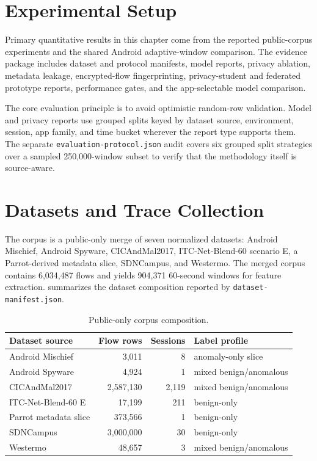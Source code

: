 \section{Experimental Setup}
Primary quantitative results in this chapter come from the reported public-corpus experiments and
the shared Android adaptive-window comparison. The evidence package includes dataset and protocol
manifests, model reports, privacy ablation, metadata leakage, encrypted-flow fingerprinting,
privacy-student and federated prototype reports, performance gates, and the app-selectable model
comparison.

The core evaluation principle is to avoid optimistic random-row validation. Model and privacy
reports use grouped splits keyed by dataset source, environment, session, app family, and time
bucket wherever the report type supports them. The separate \texttt{evaluation-protocol.json} audit
covers six grouped split strategies over a sampled 250,000-window subset to verify that the
methodology itself is source-aware.

\section{Datasets and Trace Collection}
The corpus is a public-only merge of seven normalized datasets: Android Mischief, Android Spyware,
CICAndMal2017, ITC-Net-Blend-60 scenario E, a Parrot-derived metadata slice, SDNCampus, and
Westermo. The merged corpus contains 6,034,487 flows and yields 904,371 60-second windows for
feature extraction.  summarizes the dataset composition reported by
\texttt{dataset-manifest.json}.

\begin{table}[htbp]
  \centering
  \caption{Public-only corpus composition.}
  \label{tab:dataset-sources}
  \small
  \begin{tabular}{p{4.1cm}rrp{5.1cm}}
    \toprule
    Dataset source & Flow rows & Sessions & Label profile \\
    \midrule
    Android Mischief & 3,011 & 8 & anomaly-only slice \\
    Android Spyware & 4,924 & 1 & mixed benign/anomalous \\
    CICAndMal2017 & 2,587,130 & 2,119 & mixed benign/anomalous \\
    ITC-Net-Blend-60 E & 17,199 & 211 & benign-only \\
    Parrot metadata slice & 373,566 & 1 & benign-only \\
    SDNCampus & 3,000,000 & 30 & benign-only \\
    Westermo & 48,657 & 3 & mixed benign/anomalous \\
    \bottomrule
  \end{tabular}
\end{table}


